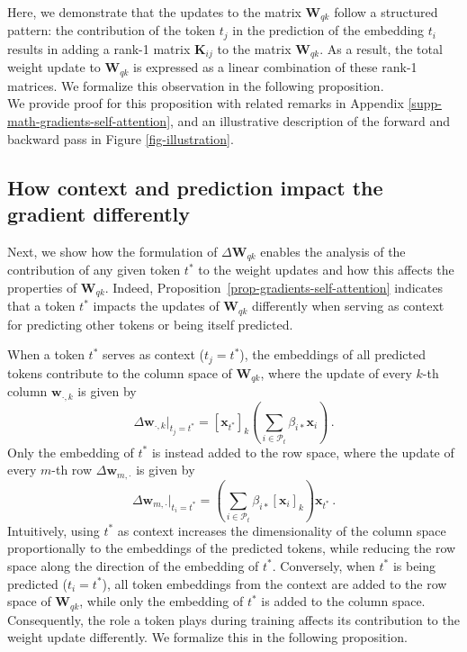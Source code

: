 Here, we demonstrate that the updates to the matrix $\bm{W}_{qk}$ follow a structured pattern: the contribution of the token $t_j $ in the prediction of the embedding $t_i$ results in adding a rank-1 matrix $\bm{K}_{ij}$ to the matrix $\bm{W}_{qk}$.
%
As a result, the total weight update to $\bm{W}_{qk}$ is expressed as a linear combination of these rank-1 matrices.
%
We formalize this observation in the following proposition.
%
\\

%

We provide proof for this proposition with related remarks in Appendix \ref{supp-math-gradients-self-attention}, and an illustrative description of the forward and backward pass in Figure \ref{fig-illustration}.
%


\subsection{How context and prediction impact the gradient differently}
%
Next, we show how the formulation of $\Delta \bm{W}_{qk}$ enables the analysis of the contribution of any given token $t^*$ to the weight updates and how this affects the properties of $\bm{W}_{qk}$.
%
Indeed, Proposition~\ref{prop-gradients-self-attention} indicates that a token $t^*$ impacts the updates of $\bm{W}_{qk}$ differently when serving as context for predicting other tokens or being itself predicted.
%

When a token $t^*$ serves as context ($t_j = t^*$), the embeddings of all predicted tokens contribute to the column space of $\bm{W}_{qk}$, where the update of every $k$-th column $\bm{w}_{\cdot, k}$ is given by
%
\begin{equation}
    \Delta \bm{w}_{\cdot, k} \Big|_{t_j = t^*}= [\bm{x}_{t^*}]_k \left(\sum_{i \in \mathcal{P}_{t}}\beta_{i*}\bm{x}_i\right)\,.
\end{equation}
%
Only the embedding of $t^*$ is instead added to the row space, where the update of every $m$-th row $\Delta \bm{w}_{m, \cdot}$ is given by
%
\begin{equation}
    \Delta \bm{w}_{m, \cdot} \Big|_{t_i = t^*} = \left(\sum_{i \in \mathcal{P}_{t}}\beta_{i*}[\bm{x}_{i}]_k\right)\bm{x}_{t^*}\,.
\end{equation}
%
Intuitively, using $t^*$ as context increases the dimensionality of the column space proportionally to the embeddings of the predicted tokens, while reducing the row space along the direction of the embedding of $t^*$.
%
Conversely, when $t^*$ is being predicted ($t_i = t^*$), all token embeddings from the context are added to the row space of $\bm{W}_{qk}$, while only the embedding of $t^*$ is added to the column space.
%
Consequently, the role a token plays during training affects its contribution to the weight update differently.
%
We formalize this in the following proposition.
%



